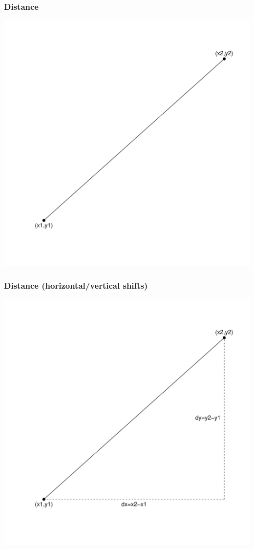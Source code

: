 \documentclass[xcolor=x11names,compress]{beamer}\usepackage[]{graphicx}\usepackage[]{color}
\newenvironment{knitrout}{}{} %
\begin{document}
\begin{frame}[plain]
  \frametitle{Distance}

\begin{knitrout}\tiny
{}\color{fgcolor}

{\centering \includegraphics[width=.6\linewidth]{figure/beamer-dist3-1} 

}



\end{knitrout}

\end{frame}

\begin{frame}[plain]
  \frametitle{Distance (horizontal/vertical shifts)}
\begin{knitrout}\tiny
{}\color{fgcolor}

{\centering \includegraphics[width=.6\linewidth]{figure/beamer-dist4-1} 

}



\end{knitrout}
\end{frame}
\end{document}
